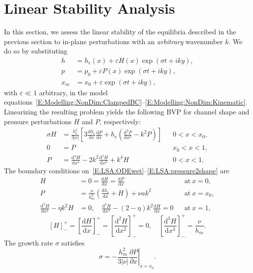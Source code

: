 \documentclass{jfm}
\newcommand{\dd}[2]{\frac{\mathrm{d} #1}{\mathrm{d} #2}}
\newcommand{\ddp}[2]{\frac{\partial #1}{\partial #2}}
\renewcommand{\Pi}{P}
\renewcommand{\Lambda}{H} %
\newcommand{\poisson}{\eta} %
\newcommand{\aspect}{a} %
\begin{document}
\section{Linear Stability Analysis}\label{S:LSA}
In this section, we assess the linear stability of the equilibria described in the previous section to in-plane perturbations with an \textit{arbitrary} wavenumber $k$. We do so by substituting 
\begin{align}
h &= h_e(x) + \varepsilon \Lambda(x)\exp(\sigma t + i k y),\label{E:LSA:Perturbation1} \\
 p &= p_0 + \varepsilon \Pi(x)\exp(\sigma t + i k y),\\ x_m  &= x_0 +  \varepsilon \exp(\sigma t + i k y),\label{E:LSA:Perturbation3}
\end{align}
with $\varepsilon \ll 1$ arbitrary, in the model equations~\eqref{E:Modelling:NonDim:ClampedBC}--\eqref{E:Modelling:NonDim:Kinematic}. Linearizing the resulting problem yields the following BVP for channel shape and pressure perturbations $\Lambda$ and $\Pi$, respectively:
\begin{align}
\sigma \Lambda &=  \frac{h_e^2}{3|\nu|}\left[3\dd{h_e}{x} \dd{\Pi}{x} + h_e\left(\dd{^2 \Pi}{x^2} - k^2 \Pi\right)\right] & &0 < x < x_0,\label{E:LSA:ODEwet}\\
0 &= \Pi & &x_0 < x < 1,\label{E:LSA:ODEdry}\\
\Pi &= \dd{^4 \Lambda}{x^4} - 2k^2 \dd{^2 \Lambda}{x^2} + k^4 \Lambda & & 0 < x <1.\label{E:LSA:pressure2shape}
\end{align}
The boundary conditions on~\eqref{E:LSA:ODEwet}--\eqref{E:LSA:pressure2shape} are
\begin{align}
\Lambda &= 0 = \dd{\Lambda}{x} = \dd{\Pi}{x} & &\text{at}~x = 0,\label{E:LSA:BC_at_0}\\
\Pi &= \frac{\nu}{h_m^2}\left(\dd{h_e}{x} + \Lambda\right) + \nu \aspect k^2 & &\text{at}~x = x_0,\label{E:LSA:pressure_bc}\\
\dd{^2 \Lambda}{x^2} - \poisson k^2
\Lambda & = 0, \quad  \dd{^3 \Lambda}{x^3} - (2-\poisson)k^2 \dd{\Lambda}{x} = 0 & &\text{at}~x = 1,\label{E:LSA:BC_at_1}
\end{align}
\begin{equation}\label{E:LSA:jump_conds}
\left[\Lambda\right]_-^+= \left[\dd{\Lambda}{x}\right]_-^+ = \left[\dd{^2\Lambda}{x^2}\right]_-^+= 0, \quad\left[\dd{^3 \Lambda}{x^3}\right]_-^+ = \frac{\nu}{h_m }.
\end{equation}
The growth rate $\sigma$ satisfies
\begin{equation}\label{E:LSA:kinematic}
\sigma = -\frac{h_m^2}{3|\nu|}\left.\ddp{\Pi}{x}\right|_{x = x_0}.
\end{equation}
\end{document}
